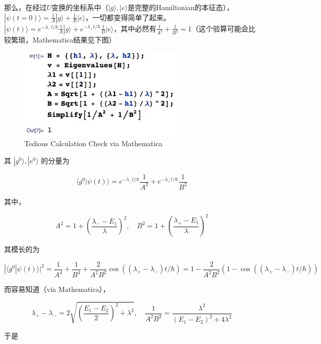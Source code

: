 那么，在经过$U$变换的坐标系中（$|g\rangle,|e\rangle$是完整的Hamiltonian的本征态），$|\psi(t=0)\rangle = \frac{1}{A}|g\rangle + \frac{1}{B}|e\rangle$，一切都变得简单了起来。$|\psi(t)\rangle = e^{-\lambda_-t/\hbar}\frac{1}{A}|g\rangle + e^{-\lambda_+t/\hbar}\frac{1}{B}|e\rangle$，其中必然有$\frac{1}{A^2} + \frac{1}{B^2} = 1$（这个验算可能会比较繁琐，Mathematica结果见下图）

\begin{figure}[ht]
\centering
\includegraphics[width=8cm]{./figures/AprPtr1.pdf}
\caption{Tedious Calculation Check via Mathematica} \label{AprPtr_fig1}
\end{figure}

其 $|g^0\rangle,|e^0\rangle$ 的分量为

\begin{equation}
\langle g^0|\psi(t)\rangle = e^{-\lambda_-t/\hbar}\frac{1}{A^2} + e^{-\lambda_+t/\hbar}\frac{1}{B^2}
\end{equation}

其中，

\begin{equation}
A^2 = 1 + \left(\frac{\lambda_- - E_1}{\lambda}\right)^2 ,\quad B^2 = 1 + \left(\frac{\lambda_+ - E_1}{\lambda}\right)^2
\end{equation}

其模长的为

\begin{equation}
|\langle g^0|\psi(t)\rangle|^2 = \frac{1}{A^4}+\frac{1}{B^4} + \frac{2}{A^2B^2}\cos((\lambda_+-\lambda_-) t/\hbar) = 1 - \frac{2}{A^2B^2}(1-\cos((\lambda_+-\lambda_-) t/\hbar))
\end{equation}

而容易知道（via Mathematica），

\begin{equation}
\lambda_+-\lambda_- = 2\sqrt{\left( \frac{E_1-E_2}{2}\right)^2 + \lambda^2},\quad \frac{1}{A^2B^2} = \frac{\lambda^2}{(E_1-E_2)^2+4\lambda^2}
\end{equation}

于是

